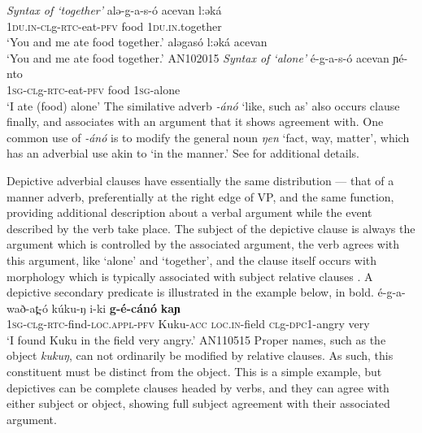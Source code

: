 \ea \textit{Syntax of `together'} \label{ex:ch13:togex}
\ea \gll alə-g-a-s-ó acevan l:əká\\
\textsc{1du.in}-\textsc{cl}g-\textsc{rtc}-eat-\textsc{pfv} food \textsc{1du.in}.together\\
\glt `You and me ate food together.' 
\ex aləgasó l:əká acevan\\
\glt `You and me ate food together.'  \hfill AN102015
\z 
\ex \textit{Syntax of ‘alone'}\label{ex:ch13:aloneex}
\ea é-g-a-s-ó acevan ɲé-nto\\
\textsc{1sg}-\textsc{cl}g-\textsc{rtc}-eat-\textsc{pfv} food \textsc{1sg}-alone\\
		`I ate (food) alone'
		\z
\z 
The similative adverb \textit{-ánó} `like, such as' also occurs clause finally, and associates with an argument that it shows agreement with. One common use of \textit{-ánó} is to modify the general noun \textit{ŋen} `fact, way, matter', which has an adverbial use akin to `in the manner.' See  for additional details.


Depictive adverbial clauses have essentially the same distribution --- that of a manner adverb, preferentially at the right edge of VP, and the same function, providing additional description about a verbal argument while the event described by the verb take place. The subject of the depictive clause is always the argument which is controlled by the associated argument, the verb agrees with this argument, like `alone' and `together', and the clause itself occurs with morphology which is typically associated with subject relative clauses . A depictive secondary predicate is illustrated in the example below, in bold.
\ea \gll  é-g-a-wað-at̪-ó kúku-ŋ i-ki \textbf{g-é-cánó} \textbf{kaɲ}	\\
\textsc{1sg-cl}g-\textsc{rtc}-find-\textsc{loc.appl-pfv} Kuku-\textsc{acc} \textsc{loc.in}-field \textsc{cl}g-\textsc{dpc1}-angry very\\
	\glt 	`I found Kuku in the field very angry.' \hfill AN110515
\z 
Proper names, such as the object \textit{kukuŋ}, can not ordinarily be modified by relative clauses. As such, this constituent must be distinct from the object. This is a simple example, but depictives can be complete clauses headed by verbs, and they can agree with either subject or object, showing full subject agreement with their associated argument. 


